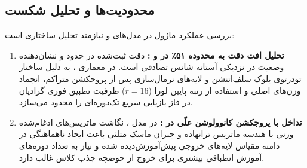 \subsection{محدودیت‌ها و تحلیل شکست}
بررسی عملکرد ماژول در مدل‌های  و  نیازمند تحلیل ساختاری است:
\begin{enumerate}
    \item \textbf{تحلیل افت دقت به محدوده ۵۱٪ در  و :} دقت ثبت‌شده در حدود  و  نشان‌دهنده وضعیت  در نزدیکی آستانه شانس تصادفی است. در معماری ، به دلیل ساختار تودرتوی بلوک سلف‌اتنشن و لایه‌های نرمال‌سازی پس از پروجکشن متراکم، انجماد وزن‌های اصلی و استفاده از رتبه پایین لورا ($r=16$) ظرفیت تطبیق فوری گرادیان در فاز بازیابی سریع تک‌دوره‌ای را محدود می‌سازد.
    \item \textbf{تداخل با پروجکشن کانوولوشن علّی در :} در مدل ، نگاشت ماتریس‌های ادغام‌شده وزنی  با هندسه ماتریس ترانهاده و جبران ماسک مثلثی باعث ایجاد ناهماهنگی در دامنه مقیاس لایه‌های خروجی پیش‌آموزش‌دیده شده و نیاز به تعداد دوره‌های آموزش انطباقی بیشتری برای خروج از حوضچه جذب کلاس غالب دارد.
\end{enumerate}
